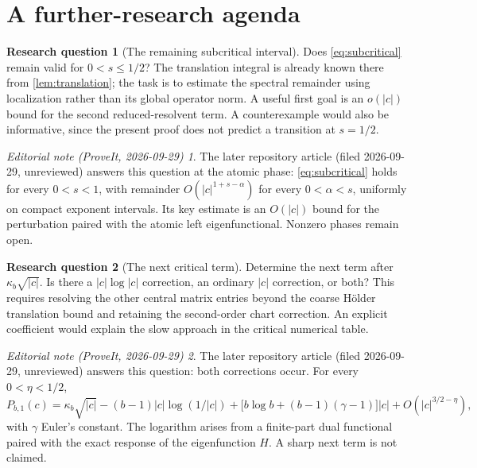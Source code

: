 \documentclass[11pt,a4paper]{article}
\numberwithin{equation}{section}
\theoremstyle{definition}
\newtheorem{question}{Research question}
\theoremstyle{remark}
\newtheorem*{ednote}{Editorial note (ProveIt, 2026-09-29)}
\begin{document}
\section{A further-research agenda}
\label{sec:questions}

\begin{question}[The remaining subcritical interval]
Does \cref{eq:subcritical} remain valid for $0<s\le1/2$?
The translation integral is already known there from
\cref{lem:translation}; the task is to estimate the spectral remainder
using localization rather than its global operator norm. A useful first
goal is an $o(|c|)$ bound for the second reduced-resolvent term. A
counterexample would also be informative, since the present proof does
not predict a transition at $s=1/2$.
\end{question}
\begin{ednote}
The later repository article
 (filed 2026-09-29,
unreviewed) answers this question at the atomic phase:
\cref{eq:subcritical} holds for every $0<s<1$, with remainder
$O(|c|^{1+s-\alpha})$ for every $0<\alpha<s$, uniformly on compact
exponent intervals. Its key estimate is an $O(|c|)$ bound for the
perturbation paired with the atomic left eigenfunctional. Nonzero phases
remain open.
\end{ednote}

\begin{question}[The next critical term]
Determine the next term after $\kappa_b\sqrt{|c|}$. Is there a
$|c|\log|c|$ correction, an ordinary $|c|$ correction, or both?
This requires resolving the other central matrix entries beyond the
coarse H\"older translation bound and retaining the second-order chart
correction. An explicit coefficient would explain the slow approach in
the critical numerical table.
\end{question}
\begin{ednote}
The later repository article
 (filed
2026-09-29, unreviewed) answers this question: both corrections occur. For
every $0<\eta<1/2$,
\[
 P_{b,1}(c)=\kappa_b\sqrt{|c|}-(b-1)|c|\log(1/|c|)
 +\bigl[b\log b+(b-1)(\gamma-1)\bigr]|c|+O(|c|^{3/2-\eta}),
\]
with $\gamma$ Euler's constant. The logarithm arises from a finite-part
dual functional paired with the exact response of the eigenfunction $H$. A
sharp next term is not claimed.
\end{ednote}
\end{document}
